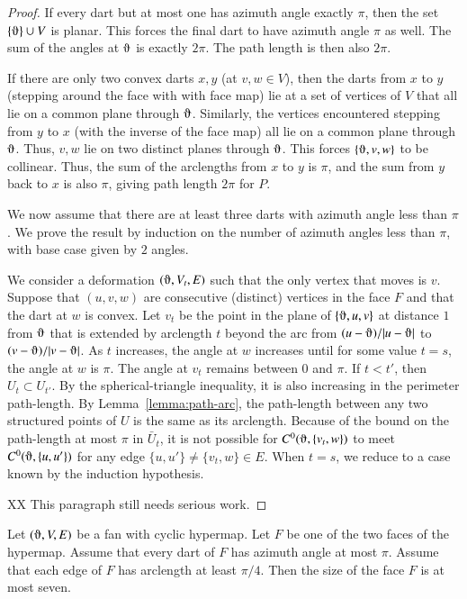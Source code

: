 \begin{proof}  If every dart but at most one 
has azimuth angle exactly $\pi$, then the set $\{\orgn\}\cup V$ is
planar.  This forces the final dart to have azimuth angle $\pi$ as well. 
The sum of the angles at $\orgn$ is exactly $2\pi$.  The path length
is then also $2\pi$.

If there are only two convex darts $x,y$ (at $v,w\in V$), 
then the darts from $x$ to $y$ (stepping around the face with with face map) lie at a set of vertices of $V$ that all lie on a common plane through $\orgn$.  Similarly, the vertices encountered stepping from $y$ to $x$ (with the inverse of the face map) all lie on a common plane through $\orgn$.  Thus, $v,w$ lie on two distinct planes through $\orgn$.  This forces $\{\orgn,v,w\}$ to be collinear.
Thus, the sum of the arclengths from $x$ to $y$ is $\pi$, and the sum from $y$ back to $x$ is also $\pi$, giving path length $2\pi$ for $P$.

We now assume that there are at least three darts with azimuth angle less than $\pi$.
We prove the result by induction on the number of azimuth angles less than $\pi$,
with base case given by $2$ angles.




We consider a deformation $(\orgn,V_t,E)$ such that the only vertex that moves is
$v$.  Suppose that $(u,v,w)$ are consecutive (distinct) vertices in the face  $F$ and that the dart at $w$ is convex.
Let $v_t$ be the point in the plane of $\{\orgn,u,v\}$ at distance $1$ from $\orgn$ that
is extended by arclength $t$ beyond the arc from $(u-\orgn)/|u-\orgn|$ to $(v-\orgn)/|v-\orgn|$.
As $t$ increases, the angle at $w$ increases until for some value $t=s$, the angle
at $w$ is $\pi$.  The angle at $v_t$ remains between $0$ and $\pi$.  If $t<t'$, then $U_t\subset U_{t'}$.   By the spherical-triangle inequality, it is
also increasing in the perimeter path-length.   
By Lemma~\ref{lemma:path-arc}, the path-length between any two structured 
points of $U$ is the same as its arclength.
Because of the bound on the path-length
at most $\pi$ in $\bar U_t$, it is not possible for $C^0(\orgn,\{v_t,w\})$ to meet
$C^0(\orgn,\{u,u'\})$ for any edge $\{u,u'\}\ne\{v_t,w\}\in E$.   
When $t=s$, we reduce to a case known by the induction hypothesis.

XX This paragraph still needs serious work.
\end{proof}





\begin{lemma}
    \label{lemma:7-sides}
Let $(\orgn,V,E)$ be a fan with cyclic hypermap.
Let $F$ be one of the two faces of the
hypermap.  Assume that every dart of $F$ has azimuth angle at
most $\pi$.  Assume that each edge of $F$ has arclength at least $\pi/4$.
Then the size of the face $F$ is at most seven.
\end{lemma}

